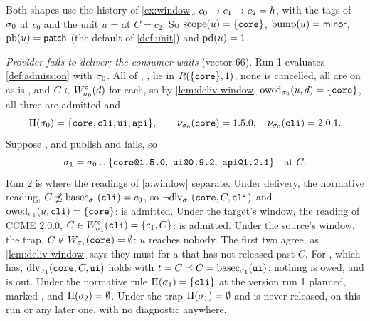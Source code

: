 \begin{example}
\label{ex:orphan}
Both shapes use the history of \cref{ex:window}, $c_0 \to c_1 \to c_2 =
h$, with the tags of $\sigma_0$ at $c_0$ and the unit $u$ =
 at $C = c_2$. So $\mathrm{scope}(u) =
\{\texttt{core}\}$, $\mathrm{bump}(u) = \mathsf{minor}$, $\mathrm{pb}(u) = \mathsf{patch}$ (the default of
\cref{def:unit}) and $\mathrm{pd}(u) = 1$.

\emph{Provider fails to deliver; the consumer waits} (vector 66). Run 1
evaluates \cref{def:admission} with $\sigma_0$. All of , ,
 lie in $R(\{\texttt{core}\},1)$, none is cancelled, all are
on \stable{} as is , and $C \in W^{\circ}_{\sigma_0}(d)$ for each, so by
\cref{lem:deliv-window} $\mathrm{owed}_{\sigma_0}(u,d) = \{\texttt{core}\}$, all three are
admitted and
\[
  \Pi(\sigma_0) = \{\texttt{core},\texttt{cli},\texttt{ui},\texttt{api}\},\qquad
  \nu_{\sigma_0}(\texttt{core}) = 1.5.0,\quad
  \nu_{\sigma_0}(\texttt{cli}) = 2.0.1 .
\]
Suppose ,  and  publish and  fails, so
\[
  \sigma_1 = \sigma_0 \cup \{\texttt{core@1.5.0},\ \texttt{ui@0.9.2},\ \texttt{api@1.2.1}\}
  \quad\text{at } C.
\]
Run 2 is where the readings of \cref{a:window} separate. Under delivery, the
normative reading, $C \not\preceq \mathrm{basec}_{\sigma_1}(\texttt{cli}) = c_0$, so
$\lnot\mathrm{dlv}_{\sigma_1}(\texttt{core},C,\texttt{cli})$ and
$\mathrm{owed}_{\sigma_1}(u,\texttt{cli}) = \{\texttt{core}\}$:  is admitted. Under
the target's window, the reading of CCME 2.0.0, $C \in W^{\circ}_{\sigma_1}(\texttt{cli})
= \{c_1, C\}$:  is admitted. Under the source's window, the trap,
$C \notin W_{\sigma_1}(\texttt{core}) = \emptyset$: $u$ reaches nobody.
The first two agree, as \cref{lem:deliv-window} says they must for a
 that has not released past $C$. For , which has,
$\mathrm{dlv}_{\sigma_1}(\texttt{core},C,\texttt{ui})$ holds with $t = C \preceq C =
\mathrm{basec}_{\sigma_1}(\texttt{ui})$: nothing is owed, and  is out. Under the
normative rule $\Pi(\sigma_1) = \{\texttt{cli}\}$ at the version run 1 planned,
marked , and $\Pi(\sigma_2) = \emptyset$. Under the trap
$\Pi(\sigma_1) = \emptyset$ and  is never released, on this run or any
later one, with no diagnostic anywhere.


\end{example}

